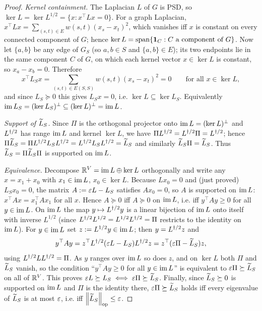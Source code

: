 \begin{proof}
\emph{Kernel containment.} The Laplacian $L$ of $G$ is PSD, so
$\ker L=\ker L^{1/2}=\{x:x^\top L x=0\}$. For a graph Laplacian,
$x^\top L x=\sum_{(s,t)\in E}w(s,t)(x_s-x_t)^2$, which vanishes iff $x$ is constant
on every connected component of $G$; hence $\ker L=\operatorname{span}\{\mathbf 1_C:C\text{ a
component of }G\}$. Now let $\{a,b\}$ be any edge of $G_S$ (so $a,b\in S$ and
$\{a,b\}\in E$); its two endpoints lie in the same component $C$ of $G$, on which
each kernel vector $x\in\ker L$ is constant, so $x_a-x_b=0$. Therefore
\[
  x^\top L_S x=\sum_{(s,t)\in E(S,S)}w(s,t)(x_s-x_t)^2=0
  \qquad\text{for all }x\in\ker L,
\]
and since $L_S\succeq 0$ this gives $L_S x=0$, i.e. $\ker L\subseteq\ker L_S$.
Equivalently $\operatorname{im} L_S=(\ker L_S)^\perp\subseteq(\ker L)^\perp=\operatorname{im} L$.

\emph{Support of $\widetilde{L}_S$.} Since $\Pi$ is the orthogonal projector onto
$\operatorname{im} L=(\ker L)^\perp$ and $L^{\dagger/2}$ has range $\operatorname{im} L$ and kernel $\ker L$,
we have $\Pi L^{\dagger/2}=L^{\dagger/2}\Pi=L^{\dagger/2}$; hence
$\Pi\widetilde{L}_S=\Pi L^{\dagger/2} L_SL^{\dagger/2}=L^{\dagger/2} L_SL^{\dagger/2}=\widetilde{L}_S$ and similarly
$\widetilde{L}_S\Pi=\widetilde{L}_S$. Thus $\widetilde{L}_S=\Pi\widetilde{L}_S\Pi$ is supported on
$\operatorname{im} L$.

\emph{Equivalence.} Decompose $\mathbb{R}^V=\operatorname{im} L\oplus\ker L$ orthogonally and
write any $x=x_1+x_0$ with $x_1\in\operatorname{im} L$, $x_0\in\ker L$. Because
$L x_0=0$ and (just proved) $L_S x_0=0$, the matrix $A:=\varepsilon L-L_S$ satisfies
$A x_0=0$, so $A$ is supported on $\operatorname{im} L$:
$x^\top A x=x_1^\top A x_1$ for all $x$. Hence $A\succeq 0$ iff $A\succeq 0$ on
$\operatorname{im} L$, i.e. iff $y^\top A y\ge 0$ for all $y\in\operatorname{im} L$.
On $\operatorname{im} L$ the map $y\mapsto L^{\dagger/2} y$ is a linear bijection of $\operatorname{im} L$
onto itself with inverse $L^{1/2}$ (since $L^{\dagger/2} L^{1/2}=L^{1/2}L^{\dagger/2}=\Pi$
restricts to the identity on $\operatorname{im} L$). For $y\in\operatorname{im} L$ set $z:=L^{1/2}y\in\operatorname{im} L$;
then $y=L^{\dagger/2} z$ and
\[
  y^\top A y
  =z^\top L^{\dagger/2}(\varepsilon L-L_S)L^{\dagger/2} z
  =z^\top(\varepsilon\Pi-\widetilde{L}_S)z ,
\]
using $L^{\dagger/2} LL^{\dagger/2}=\Pi$. As $y$ ranges over $\operatorname{im} L$ so does $z$, and on
$\ker L$ both $\Pi$ and $\widetilde{L}_S$ vanish, so the condition ``$y^\top Ay\ge0$ for
all $y\in\operatorname{im} L$'' is equivalent to $\varepsilon\Pi\succeq\widetilde{L}_S$ on all of
$\mathbb{R}^V$. This proves $\varepsilon L\succeq L_S\iff\varepsilon\Pi\succeq\widetilde{L}_S$.
Finally, since $\widetilde{L}_S\succeq0$ is supported on $\operatorname{im} L$ and $\Pi$ is the
identity there, $\varepsilon\Pi\succeq\widetilde{L}_S$ holds iff every eigenvalue of
$\widetilde{L}_S$ is at most $\varepsilon$, i.e. iff
$\left\lVert \widetilde{L}_S \right\rVert_{\mathrm{op}}\le\varepsilon$.
\end{proof}

